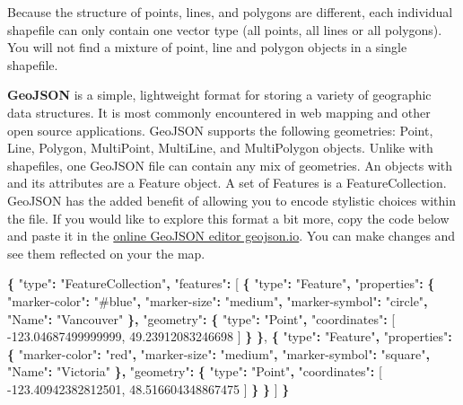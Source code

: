 \documentclass[
]{book}
\newenvironment{Shaded}{\begin{snugshade}}{\end{snugshade}}
\newcommand{\DataTypeTok}[1]{\textcolor[rgb]{0.13,0.29,0.53}{#1}}
\newcommand{\FloatTok}[1]{\textcolor[rgb]{0.00,0.00,0.81}{#1}}
\newcommand{\FunctionTok}[1]{\textcolor[rgb]{0.13,0.29,0.53}{\textbf{#1}}}
\newcommand{\OtherTok}[1]{\textcolor[rgb]{0.56,0.35,0.01}{#1}}
\newcommand{\StringTok}[1]{\textcolor[rgb]{0.31,0.60,0.02}{#1}}
\begin{document}
Because the structure of points, lines, and polygons are different, each individual shapefile can only contain one vector type (all points, all lines or all polygons). You will not find a mixture of point, line and polygon objects in a single shapefile.

\textbf{GeoJSON} is a simple, lightweight format for storing a variety of geographic data structures. It is most commonly encountered in web mapping and other open source applications. GeoJSON supports the following geometries: Point, Line, Polygon, MultiPoint, MultiLine, and MultiPolygon objects. Unlike with shapefiles, one GeoJSON file can contain any mix of geometries. An objects with and its attributes are a Feature object. A set of Features is a FeatureCollection. GeoJSON has the added benefit of allowing you to encode stylistic choices within the file. If you would like to explore this format a bit more, copy the code below and paste it in the \href{https://geojson.io/\#map=2/20.0/0.0}{online GeoJSON editor geojson.io}. You can make changes and see them reflected on your the map.

\begin{Shaded}
\begin{Highlighting}[]
\FunctionTok{\{}
  \DataTypeTok{"type"}\FunctionTok{:} \StringTok{"FeatureCollection"}\FunctionTok{,}
  \DataTypeTok{"features"}\FunctionTok{:} \OtherTok{[}
    \FunctionTok{\{}
      \DataTypeTok{"type"}\FunctionTok{:} \StringTok{"Feature"}\FunctionTok{,}
      \DataTypeTok{"properties"}\FunctionTok{:} \FunctionTok{\{}
        \DataTypeTok{"marker{-}color"}\FunctionTok{:} \StringTok{"\#blue"}\FunctionTok{,}
        \DataTypeTok{"marker{-}size"}\FunctionTok{:} \StringTok{"medium"}\FunctionTok{,}
        \DataTypeTok{"marker{-}symbol"}\FunctionTok{:} \StringTok{"circle"}\FunctionTok{,}
        \DataTypeTok{"Name"}\FunctionTok{:} \StringTok{"Vancouver"}
      \FunctionTok{\},}
      \DataTypeTok{"geometry"}\FunctionTok{:} \FunctionTok{\{}
        \DataTypeTok{"type"}\FunctionTok{:} \StringTok{"Point"}\FunctionTok{,}
        \DataTypeTok{"coordinates"}\FunctionTok{:} \OtherTok{[}
          \FloatTok{{-}123.04687499999999}\OtherTok{,}
          \FloatTok{49.23912083246698}
        \OtherTok{]}
      \FunctionTok{\}}
    \FunctionTok{\}}\OtherTok{,}
    \FunctionTok{\{}
      \DataTypeTok{"type"}\FunctionTok{:} \StringTok{"Feature"}\FunctionTok{,}
      \DataTypeTok{"properties"}\FunctionTok{:} \FunctionTok{\{}
        \DataTypeTok{"marker{-}color"}\FunctionTok{:} \StringTok{"red"}\FunctionTok{,}
        \DataTypeTok{"marker{-}size"}\FunctionTok{:} \StringTok{"medium"}\FunctionTok{,}
        \DataTypeTok{"marker{-}symbol"}\FunctionTok{:} \StringTok{"square"}\FunctionTok{,}
        \DataTypeTok{"Name"}\FunctionTok{:} \StringTok{"Victoria"}
      \FunctionTok{\},}
      \DataTypeTok{"geometry"}\FunctionTok{:} \FunctionTok{\{}
        \DataTypeTok{"type"}\FunctionTok{:} \StringTok{"Point"}\FunctionTok{,}
        \DataTypeTok{"coordinates"}\FunctionTok{:} \OtherTok{[}
          \FloatTok{{-}123.40942382812501}\OtherTok{,}
          \FloatTok{48.516604348867475}
        \OtherTok{]}
      \FunctionTok{\}}
    \FunctionTok{\}}
  \OtherTok{]}
\FunctionTok{\}}
\end{Highlighting}
\end{Shaded}
\end{document}
